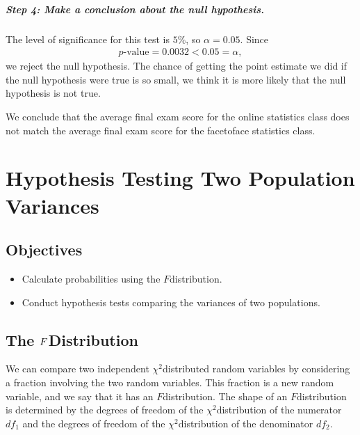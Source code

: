\documentclass[letterpaper,10pt,english]{jupyterBook}
\begin{document}
\subparagraph{Step 4: Make a conclusion about the null hypothesis.}
\label{\detokenize{Ch9 Hypothesis Tests of Two or More Populations/9.1 Hypothesis Testing Two Population Means:id5}}
\sphinxAtStartPar
The level of significance for this test is \(5\%\), so \(\alpha = 0.05\). Since
\begin{equation*}
\begin{split} p\text{-value} = 0.0032 < 0.05 = \alpha, \end{split}
\end{equation*}
\sphinxAtStartPar
we reject the null hypothesis. The chance of getting the point estimate we did if the null hypothesis were true is so small, we think it is more likely that the null hypothesis is not true.

\sphinxAtStartPar
We conclude that the average final exam score for the online statistics class does not match the average final exam score for the face\sphinxhyphen{}to\sphinxhyphen{}face statistics class.

\sphinxstepscope


\section{Hypothesis Testing Two Population Variances}
\label{\detokenize{Ch9 Hypothesis Tests of Two or More Populations/9.2 Hypothesis Testing Two Population Variances:hypothesis-testing-two-population-variances}}\label{\detokenize{Ch9 Hypothesis Tests of Two or More Populations/9.2 Hypothesis Testing Two Population Variances::doc}}

\subsection{Objectives}
\label{\detokenize{Ch9 Hypothesis Tests of Two or More Populations/9.2 Hypothesis Testing Two Population Variances:objectives}}\begin{itemize}
\item {} 
\sphinxAtStartPar
Calculate probabilities using the \(F\)\sphinxhyphen{}distribution.

\item {} 
\sphinxAtStartPar
Conduct hypothesis tests comparing the variances of two populations.

\end{itemize}


\subsection{The \protect\(F\protect\)\sphinxhyphen{}Distribution}
\label{\detokenize{Ch9 Hypothesis Tests of Two or More Populations/9.2 Hypothesis Testing Two Population Variances:the-f-distribution}}
\sphinxAtStartPar
We can compare two independent \(\chi^2\)\sphinxhyphen{}distributed random variables by considering a fraction involving the two random variables. This fraction is a new random variable, and we say that it has an \(F\)\sphinxhyphen{}distribution. The shape of an \(F\)\sphinxhyphen{}distribution is determined by the degrees of freedom of the \(\chi^2\)\sphinxhyphen{}distribution of the numerator \(df_1\) and the degrees of freedom of the \(\chi^2\)\sphinxhyphen{}distribution of the denominator \(df_2\).
\end{document}
